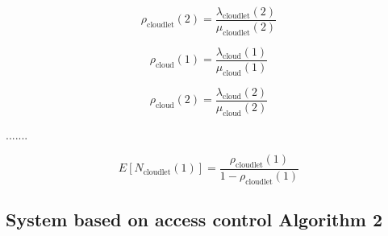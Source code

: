 \documentclass[10pt,a4paper]{article}
\begin{document}
\begin{equation}
\rho_{\text{cloudlet}}(2) = \dfrac{\lambda_{\text{cloudlet}}(2)}{\mu_{\text{cloudlet}}(2)} 
\end{equation}

\begin{equation}
\rho_{\text{cloud}}(1) = \dfrac{\lambda_{\text{cloud}}(1)}{\mu_{\text{cloud}}(1)} 
\end{equation}

\begin{equation}
\rho_{\text{cloud}}(2) = \dfrac{\lambda_{\text{cloud}}(2)}{\mu_{\text{cloud}}(2)} 
\end{equation}

.......


\begin{equation}
E[N_{\text{cloudlet}}(1)] = \dfrac{\rho_{\text{cloudlet}}(1)}{1 - \rho_{\text{cloudlet}}(1)}
\end{equation}

\subsection{System based on access control Algorithm 2}
\end{document}
